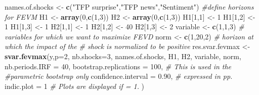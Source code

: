 \documentclass[
  12pt,
]{book}
\newenvironment{Shaded}{\begin{snugshade}}{\end{snugshade}}
\newcommand{\AttributeTok}[1]{\textcolor[rgb]{0.13,0.29,0.53}{#1}}
\newcommand{\CommentTok}[1]{\textcolor[rgb]{0.56,0.35,0.01}{\textit{#1}}}
\newcommand{\DecValTok}[1]{\textcolor[rgb]{0.00,0.00,0.81}{#1}}
\newcommand{\FloatTok}[1]{\textcolor[rgb]{0.00,0.00,0.81}{#1}}
\newcommand{\FunctionTok}[1]{\textcolor[rgb]{0.13,0.29,0.53}{\textbf{#1}}}
\newcommand{\NormalTok}[1]{#1}
\newcommand{\OtherTok}[1]{\textcolor[rgb]{0.56,0.35,0.01}{#1}}
\newcommand{\StringTok}[1]{\textcolor[rgb]{0.31,0.60,0.02}{#1}}
\theoremstyle{definition}
\theoremstyle{definition}
\theoremstyle{definition}
\theoremstyle{definition}
\theoremstyle{remark}
\begin{document}
\begin{Shaded}
\begin{Highlighting}[]
\NormalTok{names.of.shocks }\OtherTok{\textless{}{-}} \FunctionTok{c}\NormalTok{(}\StringTok{"TFP surprise"}\NormalTok{,}\StringTok{"TFP news"}\NormalTok{,}\StringTok{"Sentiment"}\NormalTok{)}
\CommentTok{\#define horizons for FEVM}
\NormalTok{H1 }\OtherTok{\textless{}{-}} \FunctionTok{array}\NormalTok{(}\DecValTok{0}\NormalTok{,}\FunctionTok{c}\NormalTok{(}\DecValTok{1}\NormalTok{,}\DecValTok{3}\NormalTok{))}
\NormalTok{H2 }\OtherTok{\textless{}{-}} \FunctionTok{array}\NormalTok{(}\DecValTok{0}\NormalTok{,}\FunctionTok{c}\NormalTok{(}\DecValTok{1}\NormalTok{,}\DecValTok{3}\NormalTok{))}
\NormalTok{H1[}\DecValTok{1}\NormalTok{,}\DecValTok{1}\NormalTok{] }\OtherTok{\textless{}{-}} \DecValTok{1}
\NormalTok{H1[}\DecValTok{1}\NormalTok{,}\DecValTok{2}\NormalTok{] }\OtherTok{\textless{}{-}} \DecValTok{1}
\NormalTok{H1[}\DecValTok{1}\NormalTok{,}\DecValTok{3}\NormalTok{] }\OtherTok{\textless{}{-}} \DecValTok{1}
\NormalTok{H2[}\DecValTok{1}\NormalTok{,}\DecValTok{1}\NormalTok{] }\OtherTok{\textless{}{-}} \DecValTok{1}
\NormalTok{H2[}\DecValTok{1}\NormalTok{,}\DecValTok{2}\NormalTok{] }\OtherTok{\textless{}{-}} \DecValTok{40}
\NormalTok{H2[}\DecValTok{1}\NormalTok{,}\DecValTok{3}\NormalTok{] }\OtherTok{\textless{}{-}} \DecValTok{2}
\NormalTok{variable }\OtherTok{\textless{}{-}} \FunctionTok{c}\NormalTok{(}\DecValTok{1}\NormalTok{,}\DecValTok{1}\NormalTok{,}\DecValTok{3}\NormalTok{) }\CommentTok{\# variables for which we want to maximize FEVD}
\NormalTok{norm }\OtherTok{\textless{}{-}} \FunctionTok{c}\NormalTok{(}\DecValTok{1}\NormalTok{,}\DecValTok{20}\NormalTok{,}\DecValTok{2}\NormalTok{) }\CommentTok{\# horizon at which the impact of the}
\CommentTok{\# shock is normalized to be positive}
\NormalTok{res.svar.fevmax }\OtherTok{\textless{}{-}}
  \FunctionTok{svar.fevmax}\NormalTok{(y,}\AttributeTok{p=}\DecValTok{2}\NormalTok{,}
              \AttributeTok{nb.shocks=}\DecValTok{3}\NormalTok{,}
\NormalTok{              names.of.shocks,}
\NormalTok{              H1,}
\NormalTok{              H2,}
\NormalTok{              variable,}
\NormalTok{              norm,}
              \AttributeTok{nb.periods.IRF =} \DecValTok{40}\NormalTok{,}
              \AttributeTok{bootstrap.replications =} \DecValTok{100}\NormalTok{, }\CommentTok{\# This is used in the}
              \CommentTok{\#parametric bootstrap only}
              \AttributeTok{confidence.interval =} \FloatTok{0.90}\NormalTok{, }\CommentTok{\# expressed in pp.}
              \AttributeTok{indic.plot =} \DecValTok{1} \CommentTok{\# Plots are displayed if = 1.}
\NormalTok{  )}
\end{Highlighting}
\end{Shaded}
\end{document}
